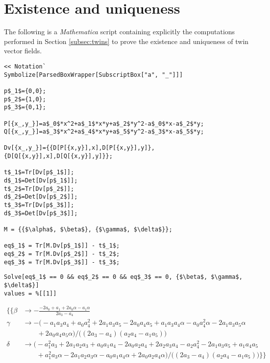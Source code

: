 \lstset{language=Mathematica,mathescape}

\section{Existence and uniqueness}

The following is a \textit{Mathematica} \cite{Mathematica9} script containing explicitly the computations performed in Section \ref{subsec:twins} to prove the existence and uniqueness of twin vector fields.

\bigskip
\bigskip

\begin{lstlisting}
<< Notation`
Symbolize[ParsedBoxWrapper[SubscriptBox["a", "_"]]]

p$_1$={0,0};
p$_2$={1,0};
p$_3$={0,1};

P[{x_,y_}]=a$_0$*x^2+a$_1$*x*y+a$_2$*y^2-a$_0$*x-a$_2$*y;
Q[{x_,y_}]=a$_3$*x^2+a$_4$*x*y+a$_5$*y^2-a$_3$*x-a$_5$*y;

Dv[{x_,y_}]={{D[P[{x,y}],x],D[P[{x,y}],y]},{D[Q[{x,y}],x],D[Q[{x,y}],y]}};

t$_1$=Tr[Dv[p$_1$]];
d$_1$=Det[Dv[p$_1$]];
t$_2$=Tr[Dv[p$_2$]];
d$_2$=Det[Dv[p$_2$]];
t$_3$=Tr[Dv[p$_3$]];
d$_3$=Det[Dv[p$_3$]];

M = {{$\alpha$, $\beta$}, {$\gamma$, $\delta$}};

eq$_1$ = Tr[M.Dv[p$_1$]] - t$_1$;
eq$_2$ = Tr[M.Dv[p$_2$]] - t$_2$;
eq$_3$ = Tr[M.Dv[p$_3$]] - t$_3$;
\end{lstlisting}

\noindent\makebox[\linewidth]{\rule{\textwidth}{0.4pt}}
\begin{lstlisting}
Solve[eq$_1$ == 0 && eq$_2$ == 0 && eq$_3$ == 0, {$\beta$, $\gamma$, $\delta$}]
values = %[[1]]
\end{lstlisting}
\begin{small}
 \begin{align*}
  \big\{\big\{ \beta &\to -\frac{-2a_0+a_1+2a_0\alpha-a_1\alpha}{2a_3-a_4} \\
  \gamma &\to - \big(-a_1 a_3 a_4+a_0 a_4^2+2 a_1 a_3 a_5-2 a_0 a_4 a_5+a_1 a_3 a_4 \alpha-a_0 a_4^2 \alpha-2 a_1 a_3 a_5 \alpha \\
  &\phantom{\gamma\to} +2 a_0 a_4 a_5 \alpha\big) / \big((2a_3-a_4)(a_2a_4-a_1a_5)\big) \\
  \delta &\to \big(-a_1^2 a_3+2 a_1 a_2 a_3+a_0 a_1 a_4-2 a_0 a_2 a_4+2 a_2 a_3 a_4-a_2 a_4^2-2 a_1 a_3 a_5+a_1 a_4 a_5 \\
  &\phantom{\delta\to} +a_1^2 a_3 \alpha-2 a_1 a_2 a_3 \alpha-a_0 a_1 a_4 \alpha+2 a_0 a_2 a_4 \alpha\big) / \big((2a_3-a_4)(a_2a_4-a_1a_5)\big) \big\}\big\}
 \end{align*}
\end{small}
\noindent\makebox[\linewidth]{\rule{\textwidth}{0.4pt}}

